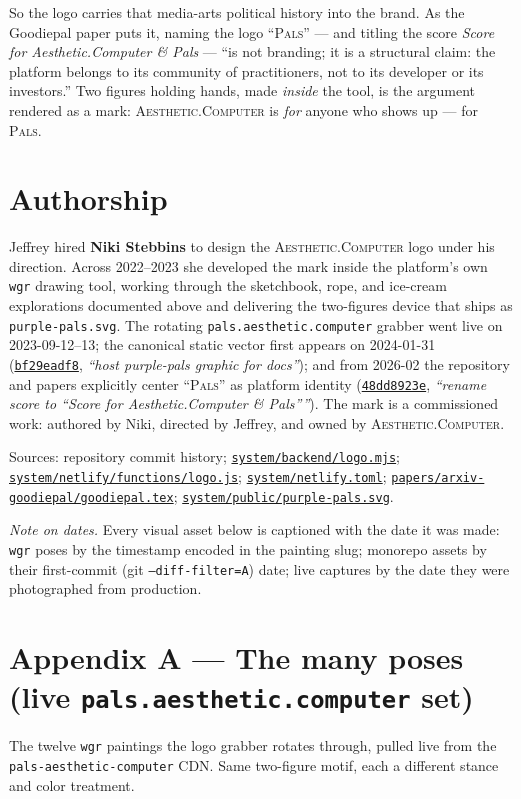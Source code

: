 \documentclass[10pt,letterpaper,twocolumn]{article}
\newcommand{\ac}{\textsc{Aesthetic}{\color{acpink}.}\textsc{Computer}}
\newcommand{\pals}{\textsc{Pals}}
\newcommand{\commit}[2]{\href{https://github.com/whistlegraph/aesthetic-computer/commit/#1}{\texttt{#1}}, \emph{``#2''}}
\newcommand{\repofile}[1]{\href{https://github.com/whistlegraph/aesthetic-computer/blob/main/#1}{\texttt{#1}}}
\begin{document}
So the logo carries that media-arts political history into the brand. As
the Goodiepal paper puts it, naming the logo ``\pals{}'' --- and titling
the score \emph{Score for Aesthetic{\color{acpink}.}Computer \& Pals} --- ``is not
branding; it is a structural claim: the platform belongs to its community
of practitioners, not to its developer or its investors.'' Two figures
holding hands, made \emph{inside} the tool, is the argument rendered as a
mark: \ac{} is \emph{for} anyone who shows up --- for \pals{}.

\section{Authorship}

Jeffrey hired \textbf{Niki Stebbins} to design the \ac{} logo under his
direction. Across 2022--2023 she developed the mark inside the platform's
own \texttt{wgr} drawing tool, working through the sketchbook, rope, and
ice-cream explorations documented above and delivering the two-figures
device that ships as \texttt{purple-pals.svg}. The rotating
\texttt{pals.aesthetic.computer} grabber went live on 2023-09-12--13; the
canonical static vector first appears on 2024-01-31
(\commit{bf29eadf8}{host purple-pals graphic for docs}); and from 2026-02
the repository and papers explicitly center ``\pals{}'' as platform
identity (\commit{48dd8923e}{rename score to ``Score for
Aesthetic.Computer \& Pals''}). The mark is a commissioned work: authored
by Niki, directed by Jeffrey, and owned by \ac{}.

\vspace{0.6em}
{\footnotesize\color{acgray}\noindent Sources: repository commit history;
\repofile{system/backend/logo.mjs};
\repofile{system/netlify/functions/logo.js};
\repofile{system/netlify.toml};
\repofile{papers/arxiv-goodiepal/goodiepal.tex};
\repofile{system/public/purple-pals.svg}.\par}

\onecolumn
\appendix

\noindent\emph{Note on dates.} Every visual asset below is captioned with
the date it was made: \texttt{wgr} poses by the timestamp encoded in the
painting slug; monorepo assets by their first-commit (git
\texttt{--diff-filter=A}) date; live captures by the date they were
photographed from production.

\section*{Appendix A --- The many poses (live \texttt{pals.aesthetic.computer} set)}
\noindent The twelve \texttt{wgr} paintings the logo grabber rotates
through, pulled live from the \texttt{pals-aesthetic-computer} CDN. Same
two-figure motif, each a different stance and color treatment.
\vspace{1.2em}
\end{document}
